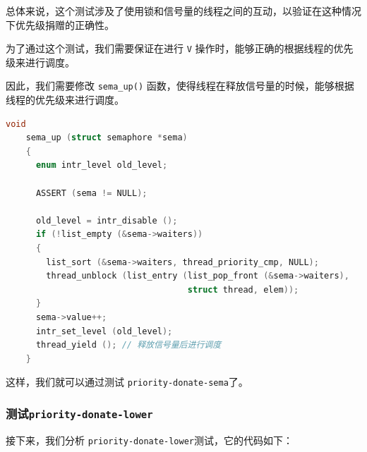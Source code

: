 \documentclass{article}
\begin{document}
总体来说，这个测试涉及了使用锁和信号量的线程之间的互动，以验证在这种情况下优先级捐赠的正确性。

为了通过这个测试，我们需要保证在进行 \texttt{V} 操作时，能够正确的根据线程的优先级来进行调度。

因此，我们需要修改 \texttt{sema\_up()} 函数，使得线程在释放信号量的时候，能够根据线程的优先级来进行调度。

\begin{lstlisting}[language=C, title=修改后的\texttt{sema\_up()}函数]
    void
    sema_up (struct semaphore *sema) 
    {
      enum intr_level old_level;
    
      ASSERT (sema != NULL);
    
      old_level = intr_disable ();
      if (!list_empty (&sema->waiters)) 
      {
        list_sort (&sema->waiters, thread_priority_cmp, NULL);
        thread_unblock (list_entry (list_pop_front (&sema->waiters),
                                    struct thread, elem));
      }
      sema->value++;
      intr_set_level (old_level);
      thread_yield (); // 释放信号量后进行调度
    }
\end{lstlisting}

这样，我们就可以通过测试 \texttt{priority-donate-sema}了。

\subsubsection{测试\texttt{priority-donate-lower}}

接下来，我们分析 \texttt{priority-donate-lower}测试，它的代码如下：
\end{document}
